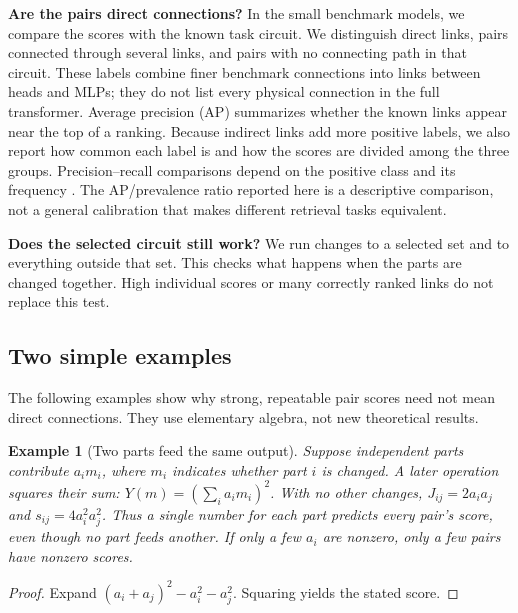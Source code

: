 \documentclass[11pt,letterpaper]{article}
\newtheorem{proposition}{Example}
\begin{document}
\textbf{Are the pairs direct connections?} In the small benchmark models, we
compare the scores with the known task circuit. We distinguish direct links,
pairs connected through several links, and pairs with no connecting path in
that circuit. These labels combine finer benchmark connections into links
between heads and MLPs; they do not list every physical connection in the full
transformer. Average precision (AP) summarizes whether the known links appear
near the top of a ranking. Because indirect links add more positive labels,
we also report how common each label is and how the scores are divided among
the three groups. Precision--recall comparisons depend on the positive
class and its frequency \cite{davis2006precisionrecall,saito2015precisionrecall}.
The AP/prevalence ratio reported here is a descriptive comparison, not a general
calibration that makes different retrieval tasks equivalent.

\textbf{Does the selected circuit still work?} We run changes to a selected set
and to everything outside that set. This checks what happens when the parts
are changed together. High individual scores or many correctly ranked links
do not replace this test.

\subsection*{Two simple examples}
The following examples show why strong, repeatable pair scores need not mean
direct connections. They use elementary algebra, not new theoretical results.

\begin{proposition}[Two parts feed the same output]
Suppose independent parts contribute $a_i m_i$, where $m_i$ indicates whether
part $i$ is changed. A later operation squares their sum:
$Y(m)=(\sum_i a_i m_i)^2$. With no other changes,
$J_{ij}=2a_i a_j$ and $s_{ij}=4a_i^2a_j^2$. Thus a single number for each part
predicts every pair's score, even though no part feeds another. If only a few
$a_i$ are nonzero, only a few pairs have nonzero scores.
\end{proposition}
\begin{proof}
Expand $(a_i+a_j)^2-a_i^2-a_j^2$. Squaring yields the stated score.
\end{proof}
\end{document}
